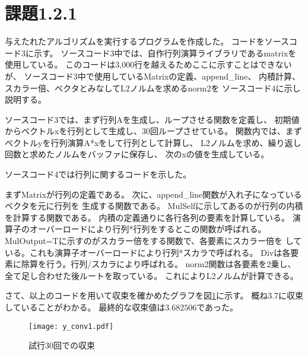 \documentclass[uplatex, 11pt,a4j, titlepage]{jsarticle}
\begin{document}

\newpage


\subtitle{2020/10/*}



\section{課題1.2.1}

与えたれたアルゴリズムを実行するプログラムを作成した。
コードをソースコード3に示す。
ソースコード3中では、自作行列演算ライブラリであるmatrixを使用している。
このコードは3,000行を越えるためここに示すことはできないが、
ソースコード3中で使用しているMatrixの定義、append\_line、
内積計算、スカラー倍、ベクタとみなしてL2ノルムを求めるnorm2を
ソースコード4に示し説明する。

ソースコード3では、まず行列Aを生成し、ループさせる関数を定義し、
初期値からベクトルxを行列として生成し、30回ループさせている。
関数内では、まずベクトルyを行列演算A*xをして行列として計算し、
L2ノルムを求め、繰り返し回数と求めたノルムをバッファに保存し、
次のxの値を生成している。


ソースコード4では行列に関するコードを示した。

まずMatrixが行列の定義である。
次に、append\_line関数が入れ子になっているベクタを元に行列を
生成する関数である。
Mul\<Self\>に示してあるのが行列の内積を計算する関数である。
内積の定義通りに各行各列の要素を計算している。
演算子のオーバーロードにより行列*行列をするとこの関数が呼ばれる。
Mul\<Output=T\>に示すのがスカラー倍をする関数で、各要素にスカラー倍を
している。これも演算子オーバーロードにより行列*スカラで呼ばれる。
Divは各要素に除算を行う。行列/スカラにより呼ばれる。
norm2関数は各要素を2乗し、全て足し合わせた後ルートを取っている。
これによりL2ノルムが計算できる。

さて、以上のコードを用いて収束を確かめたグラフを図\ref{y_conv1}に示す。
概ね3.7に収束していることがわかる。
最終的な収束値は$3.682506$であった。


\begin{figure}
    \centering
    \texttt{[image: y\_conv1.pdf]}
    \caption{試行30回での収束}
    \label{y_conv1}
\end{figure}

\newpage 
\end{document}
